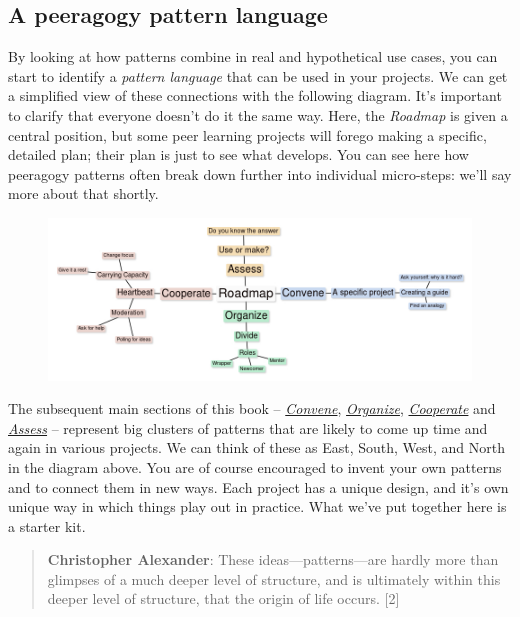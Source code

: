 \subsection{A peeragogy pattern language}

By looking at how patterns combine in real and hypothetical use cases,
you can start to identify a \emph{pattern language} that can be used in
your projects. We can get a simplified view of these connections with
the following diagram. It's important to clarify that everyone doesn't
do it the same way. Here, the \emph{Roadmap} is given a central
position, but some peer learning projects will forego making a specific,
detailed plan; their plan is just to see what develops. You can see here
how peeragogy patterns often break down further into individual
micro-steps: we'll say more about that shortly.

\begin{figure}[htbp]
\centering
\includegraphics[width=\textwidth]{../pictures/pattern-language.jpg}
\end{figure}

The subsequent main sections of this book --
\href{http://peeragogy.org/convene/}{\emph{Convene}},
\href{http://peeragogy.org/organize/}{\emph{Organize}},
\href{http://peeragogy.org/facilitate/}{\emph{Cooperate}} and
\href{http://peeragogy.org/assessment/}{\emph{Assess}} -- represent big
clusters of patterns that are likely to come up time and again in
various projects. We can think of these as East, South, West, and North
in the diagram above. You are of course encouraged to invent your own
patterns and to connect them in new ways. Each project has a unique
design, and it's own unique way in which things play out in practice.
What we've put together here is a starter kit.

\begin{quote}
\textbf{Christopher Alexander}: These ideas---patterns---are hardly more
than glimpses of a much deeper level of structure, and is ultimately
within this deeper level of structure, that the origin of life occurs.
{[}2{]}
\end{quote}
